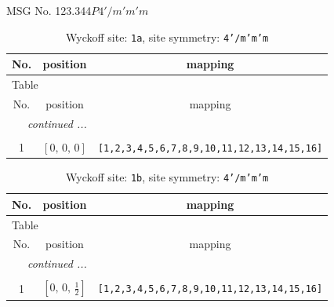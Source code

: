 \documentclass[fleqn,8pt]{jsarticle}
\begin{document}
\setcounter{MaxMatrixCols}{32}

\renewcommand{\tablename}{Table~}
\renewcommand{\figurename}{Figure~}
\begin{center}
\LARGE
MSG No. 123.344\quad$P4'/m'm'm$
\end{center}
\renewcommand{\arraystretch}{1.2}
\begin{longtable}{ccc}
\caption{Wyckoff site: {\tt 1a}, site symmetry: {\tt 4'/m'm'm}}
 \\
 \hline \hline
No. & position & mapping \\ \hline \endfirsthead

\multicolumn{2}{l}{\tablename\ \thetable{}} \\
 \hline \hline
No. & position & mapping \\ \hline \endhead

 \hline \hline
\multicolumn{2}{r}{\footnotesize\it continued ...} \\ \endfoot

 \hline \hline
\multicolumn{2}{r}{} \\ \endlastfoot

1 & $\left[ 0,\, 0,\, 0 \right]$ & {\tt [1,2,3,4,5,6,7,8,9,10,11,12,13,14,15,16]} \\
\end{longtable}
\renewcommand{\arraystretch}{1.2}
\begin{longtable}{ccc}
\caption{Wyckoff site: {\tt 1b}, site symmetry: {\tt 4'/m'm'm}}
 \\
 \hline \hline
No. & position & mapping \\ \hline \endfirsthead

\multicolumn{2}{l}{\tablename\ \thetable{}} \\
 \hline \hline
No. & position & mapping \\ \hline \endhead

 \hline \hline
\multicolumn{2}{r}{\footnotesize\it continued ...} \\ \endfoot

 \hline \hline
\multicolumn{2}{r}{} \\ \endlastfoot

1 & $\left[ 0,\, 0,\, \frac{1}{2} \right]$ & {\tt [1,2,3,4,5,6,7,8,9,10,11,12,13,14,15,16]} \\
\end{longtable}
\renewcommand{\arraystretch}{1.2}
\end{document}
